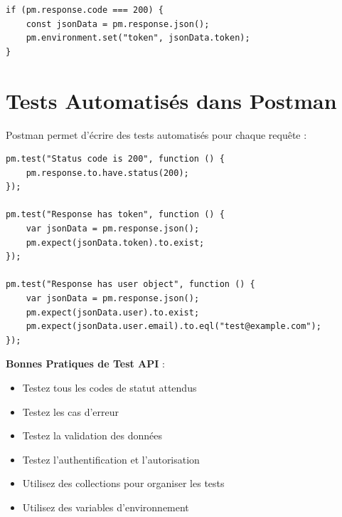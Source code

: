 \begin{lstlisting}[style=javascript, caption=Script de test Postman]
if (pm.response.code === 200) {
    const jsonData = pm.response.json();
    pm.environment.set("token", jsonData.token);
}
\end{lstlisting}

\section{Tests Automatisés dans Postman}

Postman permet d'écrire des tests automatisés pour chaque requête :

\begin{lstlisting}[style=javascript, caption=Exemple de test Postman]
pm.test("Status code is 200", function () {
    pm.response.to.have.status(200);
});

pm.test("Response has token", function () {
    var jsonData = pm.response.json();
    pm.expect(jsonData.token).to.exist;
});

pm.test("Response has user object", function () {
    var jsonData = pm.response.json();
    pm.expect(jsonData.user).to.exist;
    pm.expect(jsonData.user.email).to.eql("test@example.com");
});
\end{lstlisting}

\begin{bestpracticebox}
    \textbf{Bonnes Pratiques de Test API} :
    \begin{itemize}
        \item Testez tous les codes de statut attendus
        \item Testez les cas d'erreur
        \item Testez la validation des données
        \item Testez l'authentification et l'autorisation
        \item Utilisez des collections pour organiser les tests
        \item Utilisez des variables d'environnement
    \end{itemize}
\end{bestpracticebox}
